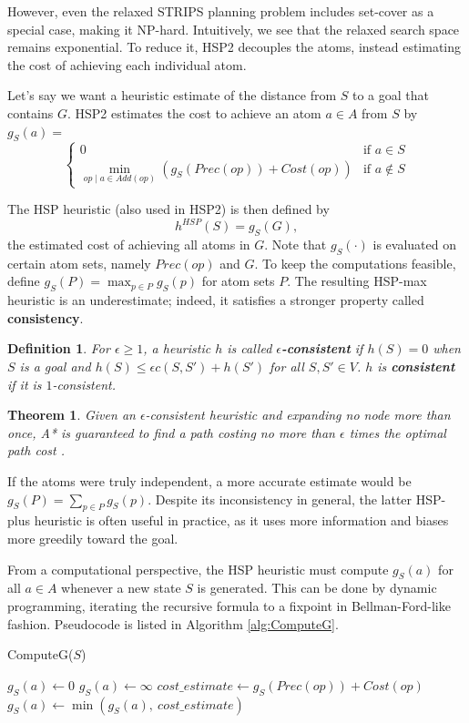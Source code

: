 \documentclass[letterpaper]{article}
\newtheorem{thm}{Theorem}
\newtheorem{defn}{Definition}
\begin{document}
However, even the relaxed STRIPS planning problem includes set-cover as a special case, making it NP-hard.
Intuitively, we see that the relaxed search space remains exponential.
To reduce it, HSP2 decouples the atoms, instead estimating the cost of achieving each individual atom.

Let's say we want a heuristic estimate of the distance from $S$ to a goal that contains $G$. HSP2 estimates the cost to achieve an atom $a\in A$ from $S$ by $g_S(a) = $
\[\begin{cases} 0  &\mbox{if } a \in S
\\ \min_{op\mid a\in Add(op)} \left(g_S(Prec(op)) + Cost(op)\right)  &\mbox{if } a \notin S \end{cases}\]

The HSP heuristic (also used in HSP2) is then defined by
\[h^{HSP}(S) = g_S(G),\]
the estimated cost of achieving all atoms in $G$. Note that $g_S(\cdot)$ is evaluated on certain atom sets, namely $Prec(op)$ and $G$.
To keep the computations feasible, define $g_S(P) = \max_{p\in P} g_S(p)$ for atom sets $P$.
The resulting HSP-max heuristic is an underestimate; indeed, it satisfies a stronger property called \textbf{consistency}.

\begin{defn} For $\epsilon\ge 1$, a heuristic $h$ is called \textbf{$\epsilon$-consistent} if $h(S) = 0$ when $S$ is a goal and $h(S) \le \epsilon c(S,S') + h(S')$ for all $S,S'\in V$. $h$ is \textbf{consistent} if it is $1$-consistent. \end{defn}
\begin{thm} Given an $\epsilon$-consistent heuristic and expanding no node more than once, A* is guaranteed to find a path costing no more than $\epsilon$ times the optimal path cost \cite{LikGorThr-ara}. \end{thm}

If the atoms were truly independent, a more accurate estimate would be $g_S(P) = \sum_{p\in P} g_S(p)$.
Despite its inconsistency in general, the latter HSP-plus heuristic is often useful in practice, as it uses more information and biases more greedily toward the goal.

From a computational perspective, the HSP heuristic must compute $g_S(a)$ for all $a\in A$ whenever a new state $S$ is generated.
This can be done by dynamic programming, iterating the recursive formula to a fixpoint in Bellman-Ford-like fashion.
Pseudocode is listed in Algorithm \ref{alg:ComputeG}.

\begin{algorithm}
\caption{ComputeG($S$)}
\label{alg:ComputeG}
\begin{algorithmic}
\STATE $g_S(a) \leftarrow 0$
\ELSE
\STATE $g_S(a) \leftarrow \infty$
\ENDIF
\ENDFOR
\REPEAT
{}
\STATE $cost\_estimate \leftarrow g_S(Prec(op)) + Cost(op)$
\STATE $g_S(a) \leftarrow \min \left(g_S(a),~cost\_estimate\right)$
\ENDFOR
\ENDFOR
{}
\end{algorithmic}
\end{algorithm}
\end{document}
